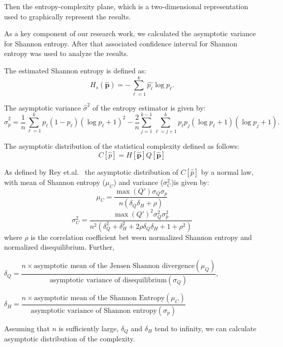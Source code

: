 Then the entropy-complexity plane, which is a two-dimensional representation used to graphically represent the results. 

As a key component of our research work, we calculated the asymptotic variance for Shannon entropy. After that associated confidence interval for Shannon entropy was used to analyze the results. 

The estimated Shannon entropy is defined as:
\begin{equation}
	H_s(\widehat{\bm{p}})=-\sum_{\ell=1}^{k}\widehat{p_\ell}\log\widehat{p_\ell}.
\end{equation}

The asymptotic variance $\widehat{\sigma}^2$ of the entropy estimator is given by:
\begin{equation}
	\widehat{\sigma}^2_p=\dfrac{1}{n}\sum_{\ell=1}^{k}p_\ell(1-p_\ell)(\log p_\ell+1)^2-\dfrac{2}{n}\sum_{j=1}^{k-1}\sum_{\ell=j+1}^{k}p_\ell p_j(\log p_\ell+1)(\log p_j+1).
\end{equation}


The asymptotic distribution of the statistical complexity defined as follows:
\begin{equation}
		C[\widehat{p}]=H[\widehat{\bm{p}}]Q[\widehat{\bm{p}}]
\end{equation}

As defined by Rey et.al.~\cite{Rey2025} the asymptotic distribution of $C[\widehat{p}]$ by a normal law, with mean of Shannon entropy ($\mu_C$) and variance (${\sigma}^2_C$)is given by:
\begin{equation}
	\mu_C=\dfrac{\max(Q'){\sigma_Q}{\sigma_p}}{n({\delta_Q}{\delta_H}+\rho)}
\end{equation} 
\begin{equation}
	{\sigma}^2_C=\dfrac{{\max(Q')}^2{\sigma^2_Q}{\sigma^2_p}}{{n^2}({\delta^2_Q}+{\delta^2_H}+2\rho \delta_Q \delta_H+1+{\rho}^2)}
\end{equation}
where $\rho$ is the correlation coefficient bet ween normalized Shannon entropy and normalized disequilibrium.
Further, 

$\delta_Q=\dfrac{n\times \text{asymptotic mean of the Jensen Shannon divergence}(\mu_Q)}{\text{asymptotic variance of disequilibrium}(\sigma_Q)}$,

$\delta_H=\dfrac{n\times \text{asymptotic mean of the Shannon Entropy}(\mu_C)}{\text{asymptotic variance of Shannon entropy}(\sigma_p)}$

Assuming that $n$ is sufficiently large, $\delta_Q$ and $\delta_H$ tend to infinity, we can calculate asymptotic distribution of the complexity.


